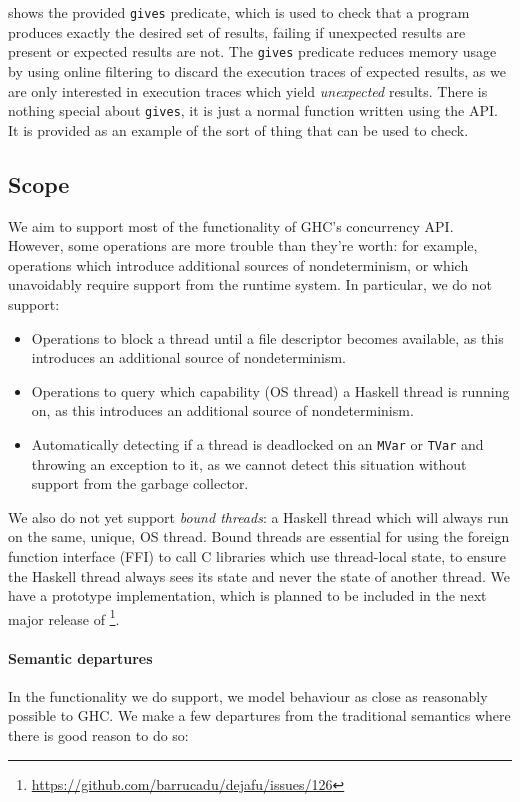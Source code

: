  shows the provided \verb|gives| predicate, which is
used to check that a program produces exactly the desired set of
results, failing if unexpected results are present or expected results
are not.  The \verb|gives| predicate reduces memory usage by using
online filtering to discard the execution traces of expected results,
as we are only interested in execution traces which yield
\emph{unexpected} results.  There is nothing special about
\verb|gives|, it is just a normal function written using the \dejafu{}
API.  It is provided as an example of the sort of thing that \dejafu{}
can be used to check.

\subsection{Scope}
We aim to support most of the functionality of GHC’s concurrency API.
However, some operations are more trouble than they're worth: for
example, operations which introduce additional sources of
nondeterminism, or which unavoidably require support from the runtime
system.  In particular, we do not support:

\begin{itemize}
\item Operations to block a thread until a file descriptor becomes
  available, as this introduces an additional source of
  nondeterminism.

\item Operations to query which capability (OS thread) a Haskell
  thread is running on, as this introduces an additional source of
  nondeterminism.

\item Automatically detecting if a thread is deadlocked on an
  \verb|MVar| or \verb|TVar| and throwing an exception to it, as we
  cannot detect this situation without support from the garbage
  collector.
\end{itemize}

We also do not yet support \emph{bound threads}: a Haskell thread
which will always run on the same, unique, OS thread.  Bound threads
are essential for using the foreign function interface (FFI) to call C
libraries which use thread-local state, to ensure the Haskell thread
always sees its state and never the state of another thread.  We have
a prototype implementation, which is planned to be included in the
next major release of
\dejafu{}\footnote{\url{https://github.com/barrucadu/dejafu/issues/126}}.

\paragraph{Semantic departures}
In the functionality we do support, we model behaviour as close as
reasonably possible to GHC.  We make a few departures from the
traditional semantics where there is good reason to do so:

